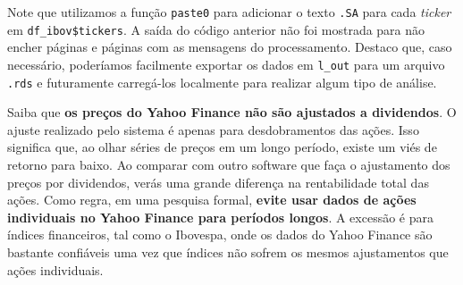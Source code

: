 \documentclass[
  11pt,
]{book}
\newenvironment{Shaded}{\begin{snugshade}}{\end{snugshade}}
\newcommand{\AttributeTok}[1]{\textcolor[rgb]{0.61,0.61,0.61}{#1}}
\newcommand{\CommentTok}[1]{\textcolor[rgb]{0.37,0.37,0.37}{\textit{#1}}}
\newcommand{\DecValTok}[1]{\textcolor[rgb]{0.06,0.06,0.06}{#1}}
\newcommand{\FloatTok}[1]{\textcolor[rgb]{0.06,0.06,0.06}{#1}}
\newcommand{\FunctionTok}[1]{\textcolor[rgb]{0,0,0}{#1}}
\newcommand{\NormalTok}[1]{#1}
\newcommand{\OtherTok}[1]{\textcolor[rgb]{0.37,0.37,0.37}{#1}}
\newcommand{\SpecialCharTok}[1]{\textcolor[rgb]{0,0,0}{#1}}
\newcommand{\StringTok}[1]{\textcolor[rgb]{0.5,0.5,0.5}{#1}}
\newenvironment{rmdcaution}
{\begin{cautionblock}

} {\end{cautionblock}}
\begin{document}
\begin{Shaded}
\end{Shaded}

Note que utilizamos a função \texttt{paste0} para adicionar o texto \texttt{\textquotesingle{}.SA\textquotesingle{}} para cada \emph{ticker} em \texttt{df\_ibov\$tickers}. A saída do código anterior não foi mostrada para não encher páginas e páginas com as mensagens do processamento. Destaco que, caso necessário, poderíamos facilmente exportar os dados em \texttt{l\_out} para um arquivo \texttt{.rds} e futuramente carregá-los localmente para realizar algum tipo de análise.

\begin{rmdcaution}
Saiba que \textbf{os preços do Yahoo Finance não são ajustados a
dividendos}. O ajuste realizado pelo sistema é apenas para
desdobramentos das ações. Isso significa que, ao olhar séries de preços
em um longo período, existe um viés de retorno para baixo. Ao comparar
com outro software que faça o ajustamento dos preços por dividendos,
verás uma grande diferença na rentabilidade total das ações. Como regra,
em uma pesquisa formal, \textbf{evite usar dados de ações individuais no
Yahoo Finance para períodos longos}. A excessão é para índices
financeiros, tal como o Ibovespa, onde os dados do Yahoo Finance são
bastante confiáveis uma vez que índices não sofrem os mesmos
ajustamentos que ações individuais.
\end{rmdcaution}
\end{document}
